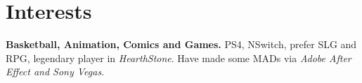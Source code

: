 \section{Interests}
\vspace{-0.2cm}
\textbf{Basketball, Animation, Comics and Games.}
PS4, NSwitch, prefer SLG and RPG,
legendary player in \textit{HearthStone}.
Have made some MADs via \textit{Adobe After Effect and Sony Vegas}.
